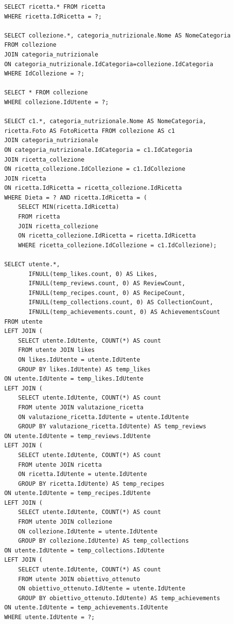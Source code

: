 ﻿\documentclass[a4paper,12pt]{report}
\begin{document}
\begin{verbatim}
    SELECT ricetta.* FROM ricetta
    WHERE ricetta.IdRicetta = ?;
    
    SELECT collezione.*, categoria_nutrizionale.Nome AS NomeCategoria
    FROM collezione
    JOIN categoria_nutrizionale
    ON categoria_nutrizionale.IdCategoria=collezione.IdCategoria
    WHERE IdCollezione = ?;
    
    SELECT * FROM collezione
    WHERE collezione.IdUtente = ?;
    
    SELECT c1.*, categoria_nutrizionale.Nome AS NomeCategoria,
    ricetta.Foto AS FotoRicetta FROM collezione AS c1
    JOIN categoria_nutrizionale 
    ON categoria_nutrizionale.IdCategoria = c1.IdCategoria
    JOIN ricetta_collezione 
    ON ricetta_collezione.IdCollezione = c1.IdCollezione
    JOIN ricetta 
    ON ricetta.IdRicetta = ricetta_collezione.IdRicetta
    WHERE Dieta = ? AND ricetta.IdRicetta = (
        SELECT MIN(ricetta.IdRicetta)
        FROM ricetta
        JOIN ricetta_collezione
        ON ricetta_collezione.IdRicetta = ricetta.IdRicetta
        WHERE ricetta_collezione.IdCollezione = c1.IdCollezione);
    
    SELECT utente.*,
           IFNULL(temp_likes.count, 0) AS Likes,
           IFNULL(temp_reviews.count, 0) AS ReviewCount,
           IFNULL(temp_recipes.count, 0) AS RecipeCount,
           IFNULL(temp_collections.count, 0) AS CollectionCount,
           IFNULL(temp_achievements.count, 0) AS AchievementsCount
    FROM utente
    LEFT JOIN (
        SELECT utente.IdUtente, COUNT(*) AS count
        FROM utente JOIN likes
        ON likes.IdUtente = utente.IdUtente
        GROUP BY likes.IdUtente) AS temp_likes
    ON utente.IdUtente = temp_likes.IdUtente
    LEFT JOIN (
        SELECT utente.IdUtente, COUNT(*) AS count
        FROM utente JOIN valutazione_ricetta
        ON valutazione_ricetta.IdUtente = utente.IdUtente
        GROUP BY valutazione_ricetta.IdUtente) AS temp_reviews
    ON utente.IdUtente = temp_reviews.IdUtente
    LEFT JOIN (
        SELECT utente.IdUtente, COUNT(*) AS count
        FROM utente JOIN ricetta
        ON ricetta.IdUtente = utente.IdUtente
        GROUP BY ricetta.IdUtente) AS temp_recipes
    ON utente.IdUtente = temp_recipes.IdUtente
    LEFT JOIN (
        SELECT utente.IdUtente, COUNT(*) AS count
        FROM utente JOIN collezione
        ON collezione.IdUtente = utente.IdUtente
        GROUP BY collezione.IdUtente) AS temp_collections
    ON utente.IdUtente = temp_collections.IdUtente
    LEFT JOIN (
        SELECT utente.IdUtente, COUNT(*) AS count
        FROM utente JOIN obiettivo_ottenuto
        ON obiettivo_ottenuto.IdUtente = utente.IdUtente
        GROUP BY obiettivo_ottenuto.IdUtente) AS temp_achievements
    ON utente.IdUtente = temp_achievements.IdUtente
    WHERE utente.IdUtente = ?;
    

\end{verbatim}
\end{document}
